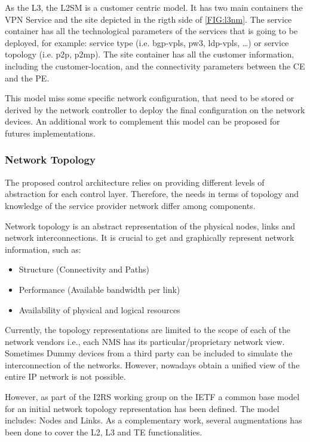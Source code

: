 \documentclass[a4paper,fleqn]{cas-dc}
\begin{document}
As the L3, the L2SM is a customer centric model. It has two main containers the VPN Service and the site depicted in the rigth side of \cref{FIG:l3nm}. The service container has all the technological parameters of the services that is going to be deployed, for example: service type (i.e. bgp-vpls, pw3, ldp-vpls, \dots) or service topology (i.e. p2p, p2mp). The site container has all the customer information, including the customer-location, and the connectivity parameters between the CE and the PE. 

This model miss some specific network configuration, that need to be stored or derived by the network controller to deploy the final configuration on the network devices. An additional work to complement this model can be proposed for futures implementations.  

\subsubsection{Network Topology}
\label{subsection:IPtopo}

The proposed control architecture relies on providing different levels of abstraction for each control layer. Therefore, the needs in terms of topology and knowledge of the service provider network differ among components. 

Network topology is an abstract representation of the physical nodes, links and network interconnections. It is crucial to get and graphically represent network information, such as:
\begin{itemize}
    \item Structure (Connectivity and Paths)
    \item Performance (Available bandwidth per link)
    \item Availability of physical and logical resources
\end{itemize}

Currently, the topology representations are limited to the scope of each of the network vendors i.e., each NMS has its particular/proprietary network view. Sometimes Dummy devices from a third party can be included to simulate the interconnection of the networks. However, nowadays obtain a unified view of the entire IP network is not possible.

However, as part of the I2RS working group on the IETF a common base model for an initial network topology representation has been defined. The model includes: Nodes and Links. As a complementary work, several augmentations has been done to cover the L2, L3 and TE functionalities.
\end{document}
